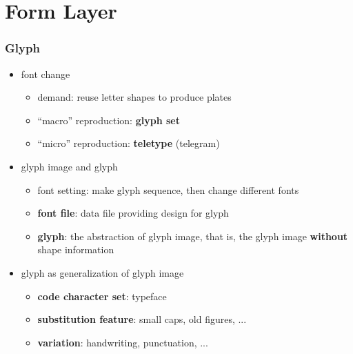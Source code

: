 \documentclass{beamer}
\begin{document}
    \section{Form Layer}

	\begin{frame}
		\frametitle{Glyph}
		
		\begin{itemize}
			\item font change
			\begin{itemize}
                \item demand: reuse letter shapes to produce plates
                \item ``macro'' reproduction: \textbf{glyph set}
                \item \color{gray} ``micro'' reproduction: \textbf{teletype} (telegram)
            \end{itemize}
			\item glyph image and glyph
			\begin{itemize}
				\item font setting: make glyph sequence, then change different fonts
				\item \textbf{font file}: data file providing design for glyph
				\item \textbf{glyph}: the abstraction of glyph image, that is, the glyph image \textbf{without} shape information
			\end{itemize}
            \item glyph as generalization of glyph image
			\begin{itemize}
				\item \textbf{code character set}: typeface
				\item \textbf{substitution feature}: small caps, old figures, ...
				\item \textbf{variation}: handwriting, punctuation, ...
            \end{itemize}
		\end{itemize}
	\end{frame}
	
\end{document}
